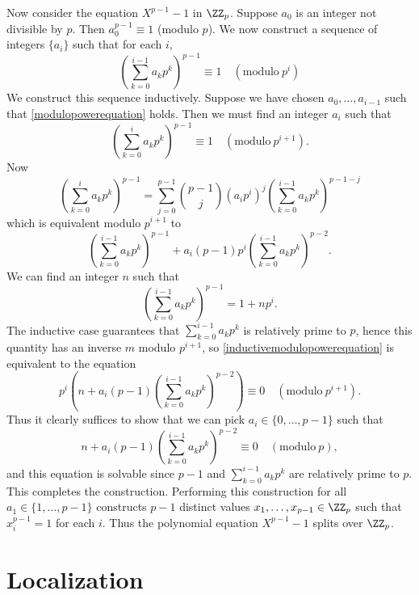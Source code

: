 \begin{example}
    Now consider the equation $X^{p-1} - 1$ in $\ZZ_p$. Suppose $a_0$ is an integer not divisible by $p$. Then $a_0^{p-1} \equiv 1$ (modulo $p$). We now construct a sequence of integers $\{ a_i \}$ such that for each $i$,
    \begin{equation} \label{modulopowerequation}
        \left( \sum_{k = 0}^{i-1} a_k p^k \right)^{p-1} \equiv 1 \quad(\text{modulo}\ p^i)
    \end{equation}
    We construct this sequence inductively. Suppose we have chosen $a_0,\dots, a_{i-1}$ such that \eqref{modulopowerequation} holds. Then we must find an integer $a_i$ such that
    \begin{equation} \label{inductivemodulopowerequation}
        \left( \sum_{k = 0}^i a_k p^k \right)^{p-1} \equiv 1 \quad(\text{modulo}\ p^{i+1}).
    \end{equation}
    Now
    \[ \left( \sum_{k = 0}^i a_k p^k \right)^{p-1} = \sum_{j = 0}^{p-1} \binom{p-1}{j} \left( a_ip^i \right)^j \left( \sum_{k = 0}^{i-1} a_k p^k \right)^{p-1-j} \]
    which is equivalent modulo $p^{i+1}$ to
    \[ \left( \sum_{k = 0}^{i-1} a_k p^k \right)^{p-1} + a_i (p-1)p^i \left( \sum_{k = 0}^{i-1} a_k p^k \right)^{p-2}. \]
    We can find an integer $n$ such that
    \[ \left( \sum_{k = 0}^{i-1} a_k p^k \right)^{p-1} = 1 + np^i. \]
    The inductive case guarantees that $\sum_{k = 0}^{i-1} a_k p^k$ is relatively prime to $p$, hence this quantity has an inverse $m$ modulo $p^{i+1}$, so \eqref{inductivemodulopowerequation} is equivalent to the equation
    \[ p^i \left(n + a_i (p-1) \left( \sum_{k = 0}^{i-1} a_k p^k \right)^{p-2} \right) \equiv 0 \quad(\text{modulo}\ p^{i+1}). \]
    Thus it clearly suffices to show that we can pick $a_i \in \{ 0, \dots, p-1 \}$ such that
    \[ n + a_i (p-1) \left( \sum_{k = 0}^{i-1} a_k p^k \right)^{p-2} \equiv 0 \quad(\text{modulo}\ p), \]
    and this equation is solvable since $p-1$ and $\sum_{k = 0}^{i-1} a_k p^k$ are relatively prime to $p$. This completes the construction. Performing this construction for all $a_1 \in \{ 1, \dots, p-1 \}$ constructs $p-1$ distinct values $x_1, \dots, x_{p-1} \in \ZZ_p$ such that $x_i^{p-1} = 1$ for each $i$. Thus the polynomial equation $X^{p-1} - 1$ splits over $\ZZ_p$.
\end{example}

\chapter{Localization}

